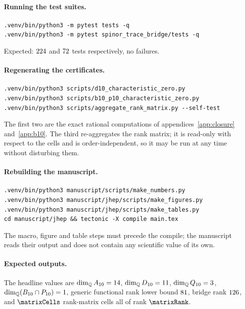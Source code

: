 \paragraph{Running the test suites.}
\begingroup\scriptsize
\begin{verbatim}
.venv/bin/python3 -m pytest tests -q
.venv/bin/python3 -m pytest spinor_trace_bridge/tests -q
\end{verbatim}
\endgroup
Expected: $224$ and $72$ tests respectively, no failures.

\paragraph{Regenerating the certificates.}
\begingroup\scriptsize
\begin{verbatim}
.venv/bin/python3 scripts/d10_characteristic_zero.py
.venv/bin/python3 scripts/b10_p10_characteristic_zero.py
.venv/bin/python3 scripts/aggregate_rank_matrix.py --self-test
\end{verbatim}
\endgroup
The first two are the exact rational computations of
appendices~\ref{app:closure} and~\ref{app:b10}. The third re-aggregates the rank
matrix; it is read-only with respect to the cells and is order-independent, so it
may be run at any time without disturbing them.

\paragraph{Rebuilding the manuscript.}
\begingroup\scriptsize
\begin{verbatim}
.venv/bin/python3 manuscript/scripts/make_numbers.py
.venv/bin/python3 manuscript/jhep/scripts/make_figures.py
.venv/bin/python3 manuscript/jhep/scripts/make_tables.py
cd manuscript/jhep && tectonic -X compile main.tex
\end{verbatim}
\endgroup
The macro, figure and table steps must precede the compile; the manuscript reads
their output and does not contain any scientific value of its own.

\paragraph{Expected outputs.}
The headline values are
$\dim_{\mathbb{Q}}A_{10} = 14$,
$\dim_{\mathbb{Q}}D_{10} = 11$,
$\dim_{\mathbb{Q}}Q_{10} = 3$,
$\dim_{\mathbb{Q}}(B_{10}\cap P_{10}) = 1$,
generic functional rank lower bound $81$,
bridge rank $126$, and $\matrixCells$ rank-matrix cells all of
rank $\matrixRank$.

